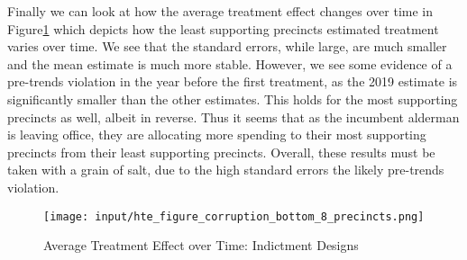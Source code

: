 Finally we can look at how the average treatment effect changes over time in Figure\ref{fig:att_comparison_corruption_bottom} which depicts how the least supporting precincts estimated treatment varies over time.
We see that the standard errors, while large, are much smaller and the mean estimate is much more stable.
However, we see some evidence of a pre-trends violation in the year before the first treatment, as the 2019 estimate is significantly smaller than the other estimates.
This holds for the most supporting precincts as well, albeit in reverse.
Thus it seems that as the incumbent alderman is leaving office, they are allocating more spending to their most supporting precincts from their least supporting precincts.
Overall, these results must be taken with a grain of salt, due to the high standard errors the likely pre-trends violation.

\begin{figure}[H]
    \centering
    \texttt{[image: input/hte\_figure\_corruption\_bottom\_8\_precincts.png]}
    \caption{Average Treatment Effect over Time: Indictment Designs}
    \label{fig:att_comparison_corruption_bottom}
\end{figure}

